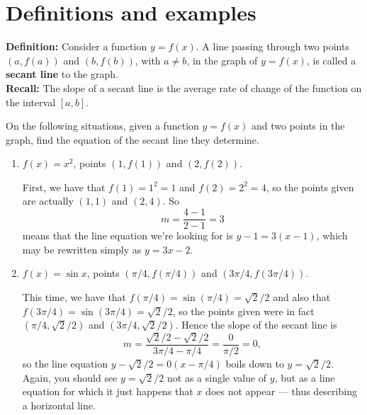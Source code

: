 \documentclass{ximera}
\begin{document}
\section{Definitions and examples}

\begin{callout}
  {\bf Definition:} Consider a function $y=f(x)$. A line passing through two points $(a,f(a))$ and $(b,f(b))$, with $a \neq b$, in the graph of $y=f(x)$, is called a \textbf{secant line} to the graph.\\
  {\bf Recall:} The slope of a secant line is the average rate of change of the function on the interval $[a,b]$.
\end{callout}

\begin{example}
  On the following situations, given a function $y=f(x)$ and two points in the graph, find the equation of the secant line they determine.
  \begin{enumerate}[label=\alph*.]
  \item $f(x) = x^2$, points $(1,f(1))$ and $(2,f(2))$.

    \begin{explanation}
      First, we have that $f(1) = 1^2=1$ and $f(2) = 2^2=4$, so the points given are actually $(1,1)$ and $(2,4)$. So $$m=\frac{4-1}{2-1}=  3$$means that the line equation we're looking for is $y-1=3(x-1)$, which may be rewritten simply as $y=3x-2$.

\begin{image}[2in]
		\end{image}

      
    \end{explanation}
  \item $f(x) = \sin x$, points $(\pi/4, f(\pi/4))$ and $(3\pi/4, f(3\pi/4))$.

    \begin{explanation}
      This time, we have that $f(\pi/4) = \sin(\pi/4) = \sqrt{2}/2$ and also that $f(3\pi/4) = \sin(3\pi/4) = \sqrt{2}/2$, so the points given were in fact $(\pi/4,\sqrt{2}/2)$ and $(3\pi/4,\sqrt{2}/2)$. Hence the slope of the secant line is $$m=\frac{\sqrt{2}/2 - \sqrt{2}/2}{3\pi/4 - \pi/4} = \frac{0}{\pi/2} = 0,$$so the line equation $y-\sqrt{2}/2 = 0(x-\pi/4)$ boils down to $y = \sqrt{2}/2$. Again, you should see $y=\sqrt{2}/2$ not as a single value of $y$, but as a line equation for which it just happens that $x$ does not appear --- thus describing a horizontal line.


\end{explanation}
\end{enumerate}
\end{example}
\end{document}
